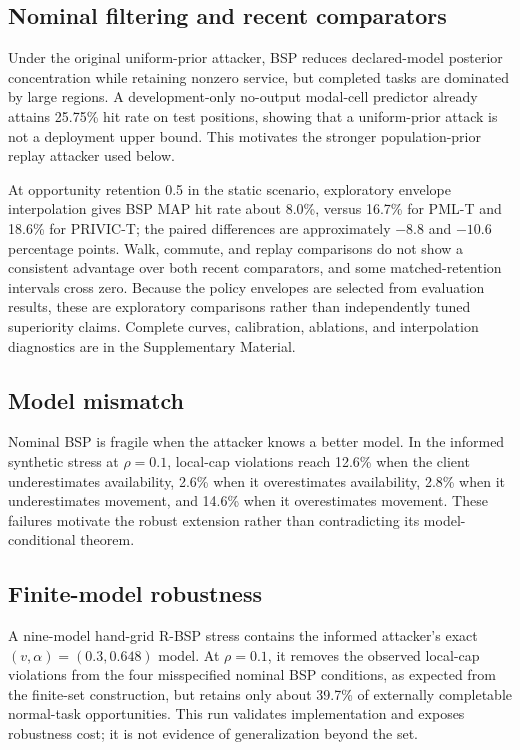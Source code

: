 \documentclass[review,11pt,times]{elsarticle}
\begin{document}
\subsection{Nominal filtering and recent comparators}
Under the original uniform-prior attacker, BSP reduces declared-model posterior concentration while retaining nonzero service, but completed tasks are dominated by large regions. A development-only no-output modal-cell predictor already attains 25.75\% hit rate on test positions, showing that a uniform-prior attack is not a deployment upper bound. This motivates the stronger population-prior replay attacker used below.

At opportunity retention 0.5 in the static scenario, exploratory envelope interpolation gives BSP MAP hit rate about 8.0\%, versus 16.7\% for PML-T and 18.6\% for PRIVIC-T; the paired differences are approximately \(-8.8\) and \(-10.6\) percentage points. Walk, commute, and replay comparisons do not show a consistent advantage over both recent comparators, and some matched-retention intervals cross zero. Because the policy envelopes are selected from evaluation results, these are exploratory comparisons rather than independently tuned superiority claims. Complete curves, calibration, ablations, and interpolation diagnostics are in the Supplementary Material.

\subsection{Model mismatch}
Nominal BSP is fragile when the attacker knows a better model. In the informed synthetic stress at \(\rho=0.1\), local-cap violations reach 12.6\% when the client underestimates availability, 2.6\% when it overestimates availability, 2.8\% when it underestimates movement, and 14.6\% when it overestimates movement. These failures motivate the robust extension rather than contradicting its model-conditional theorem.

\subsection{Finite-model robustness}
A nine-model hand-grid R-BSP stress contains the informed attacker's exact \((v,\alpha)=(0.3,0.648)\) model. At \(\rho=0.1\), it removes the observed local-cap violations from the four misspecified nominal BSP conditions, as expected from the finite-set construction, but retains only about 39.7\% of externally completable normal-task opportunities. This run validates implementation and exposes robustness cost; it is not evidence of generalization beyond the set.
\end{document}
